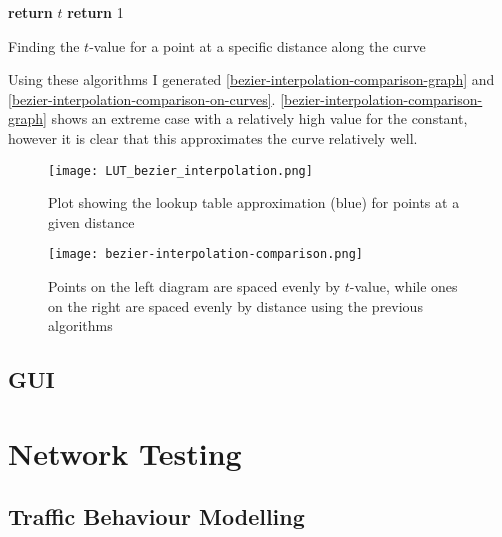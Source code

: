    \begin{algorithm}
        \begin{algorithmic}
                        \State \textbf{return} $t$
                    \EndIf
                \EndFor
                \State \textbf{return} 1
            \EndFunction
        \end{algorithmic}
        \caption{Finding the $t$-value for a point at a specific distance along the curve}
        \label{get-point-at-distance-algorithm}
    \end{algorithm}

    Using these algorithms I generated \autoref{bezier-interpolation-comparison-graph} and \autoref{bezier-interpolation-comparison-on-curves}. \autoref{bezier-interpolation-comparison-graph} shows an extreme case with a relatively high value for the  constant, however it is clear that this approximates the curve relatively well.

    \begin{figure}
        \centering
        \texttt{[image: LUT\_bezier\_interpolation.png]}
        \caption{Plot showing the lookup table approximation (blue) for points at a given distance}
        \label{bezier-interpolation-comparison-graph}
    \end{figure}

    \begin{figure}
        \centering
        \texttt{[image: bezier-interpolation-comparison.png]}
        \caption{Points on the left diagram are spaced evenly by $t$-value, while ones on the right are spaced evenly by distance using the previous algorithms}
        \label{bezier-interpolation-comparison-on-curves}
    \end{figure}

    \subsection{GUI}

\section{Network Testing}

    \subsection{Traffic Behaviour Modelling}
    \label{subsection:traffic-behaviour-modelling}

